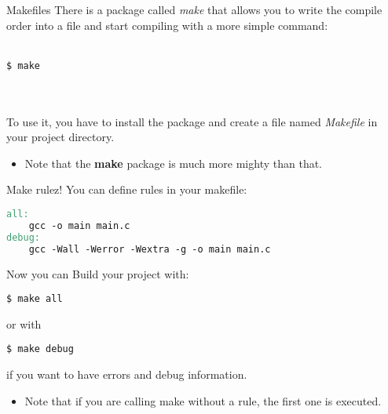 \begin{frame}[fragile]{Makefiles}
	There is a package called \textit{make} that allows you to write the compile order into a file and start compiling with a more simple command:\\\ \\
	\begin{lstlisting}[numbers=none]
$ make
\end{lstlisting}\ \\\ \\
	To use it, you have to install the package and create a file named \textit{Makefile} in your project directory.\\
	\begin{itemize}
		\item Note that the \textbf{make} package is much more mighty than that.
	\end{itemize}
\end{frame}

\begin{frame}[fragile]{Make rulez!}
	You can define rules in your makefile:
	\begin{lstlisting}[language=make,basicstyle=\scriptsize,numbers=none]
all:
	gcc -o main main.c
debug:
	gcc -Wall -Werror -Wextra -g -o main main.c
\end{lstlisting}
	Now you can Build your project with:
	\begin{lstlisting}[basicstyle=\scriptsize,numbers=none]
$ make all
\end{lstlisting}
	or with
	\begin{lstlisting}[basicstyle=\scriptsize,numbers=none]
$ make debug
\end{lstlisting}
	if you want to have errors and debug information.
	\begin{itemize}
		\item Note that if you are calling make without a rule, the first one is executed.
	\end{itemize}
\end{frame}


